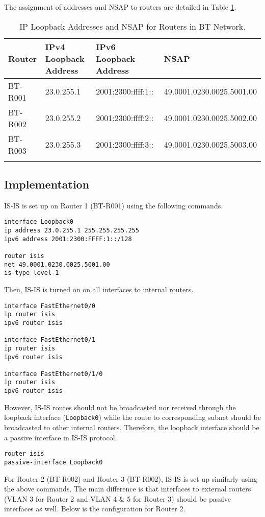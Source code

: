 The assignment of addresses and NSAP to routers are detailed in Table \ref{tab:isis}.

\begin{longtable}[]{@{}llll@{}}
\toprule
Router & IPv4 Loopback Address & IPv6 Loopback Address & NSAP\tabularnewline
\midrule
\endhead
BT-R001 & 23.0.255.1 & 2001:2300:ffff:1:: & 49.0001.0230.0025.5001.00\tabularnewline
BT-R002 & 23.0.255.2 & 2001:2300:ffff:2:: & 49.0001.0230.0025.5002.00\tabularnewline
BT-R003 & 23.0.255.3 & 2001:2300:ffff:3:: & 49.0001.0230.0025.5003.00\tabularnewline
\bottomrule
\caption{IP Loopback Addresses and NSAP for Routers in BT Network.}
\label{tab:isis}
\end{longtable}



\subsection{Implementation}

IS-IS is set up on Router 1 (BT-R001) using the following commands.

\begin{lstlisting}
interface Loopback0
ip address 23.0.255.1 255.255.255.255
ipv6 address 2001:2300:FFFF:1::/128

router isis
net 49.0001.0230.0025.5001.00
is-type level-1
\end{lstlisting}

Then, IS-IS is turned on on all interfaces to internal routers.

\begin{lstlisting}
interface FastEthernet0/0
ip router isis
ipv6 router isis

interface FastEthernet0/1
ip router isis
ipv6 router isis

interface FastEthernet0/1/0
ip router isis
ipv6 router isis
\end{lstlisting}

\clearpage

However, IS-IS routes should not be broadcasted nor received through the loopback interface (\texttt{Loopback0}) while the route to corresponding subnet should be broadcasted to other internal routers. Therefore, the loopback interface should be a passive interface in IS-IS protocol.

\begin{lstlisting}
router isis
passive-interface Loopback0
\end{lstlisting}

For Router 2 (BT-R002) and Router 3 (BT-R002), IS-IS is set up similarly using the above commands. The main difference is that interfaces to external routers (VLAN 3 for Router 2 and VLAN 4 \& 5 for Router 3) should be passive interfaces as well. Below is the configuration for Router 2.

